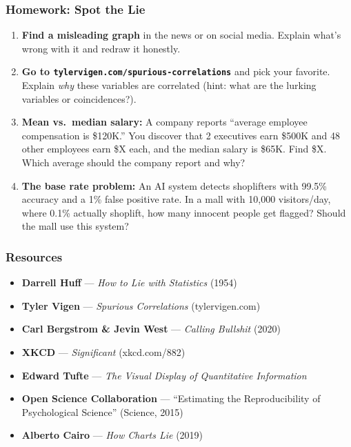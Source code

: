 \documentclass[aspectratio=169]{beamer}
\begin{document}
\begin{frame}
\frametitle{Homework: Spot the Lie}

\begin{enumerate}
  \item \textbf{Find a misleading graph} in the news or on social media. Explain what's wrong with it and redraw it honestly.

  \vspace{0.2cm}
  \item \textbf{Go to \texttt{tylervigen.com/spurious-correlations}} and pick your favorite. Explain \textit{why} these variables are correlated (hint: what are the lurking variables or coincidences?).

  \vspace{0.2cm}
  \item \textbf{Mean vs.\ median salary:} A company reports ``average employee compensation is \$120K.'' You discover that 2 executives earn \$500K and 48 other employees earn \$X each, and the median salary is \$65K. Find \$X. Which average should the company report and why?

  \vspace{0.2cm}
  \item \textbf{The base rate problem:} An AI system detects shoplifters with 99.5\% accuracy and a 1\% false positive rate. In a mall with 10{,}000 visitors/day, where 0.1\% actually shoplift, how many innocent people get flagged? Should the mall use this system?
\end{enumerate}
\end{frame}

\begin{frame}
\frametitle{Resources}

\begin{itemize}
  \item \textbf{Darrell Huff} --- \textit{How to Lie with Statistics} (1954)
  \item \textbf{Tyler Vigen} --- \textit{Spurious Correlations} (tylervigen.com)
  \item \textbf{Carl Bergstrom \& Jevin West} --- \textit{Calling Bullshit} (2020)
  \item \textbf{XKCD} --- \textit{Significant} (xkcd.com/882)
  \item \textbf{Edward Tufte} --- \textit{The Visual Display of Quantitative Information}
  \item \textbf{Open Science Collaboration} --- ``Estimating the Reproducibility of Psychological Science'' (Science, 2015)
  \item \textbf{Alberto Cairo} --- \textit{How Charts Lie} (2019)
\end{itemize}
\end{frame}
\end{document}
